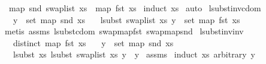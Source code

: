 \begin{isabellebody}
\ \ {\isachardoublequoteopen}map\ snd\ {\isacharparenleft}{\kern0pt}swap{\isacharunderscore}{\kern0pt}list\ xs{\isacharparenright}{\kern0pt}\ {\isacharequal}{\kern0pt}\ map\ fst\ xs{\isachardoublequoteclose}\isanewline
%
\isadelimproof
%
\endisadelimproof
%
\isatagproof
{}\isamarkupfalse%
\ {\isacharparenleft}{\kern0pt}induct\ xs{\isacharparenright}{\kern0pt}\isanewline
{}\isamarkupfalse%
\ auto%
\endisatagproof
{\isafoldproof}%
%
\isadelimproof
\isanewline
%
\endisadelimproof
\isanewline
\isanewline
{}\isamarkupfalse%
\ lsubst{\isacharunderscore}{\kern0pt}inv{\isacharunderscore}{\kern0pt}cdom{\isacharcolon}{\kern0pt}\isanewline
\ \ \ {\isachardoublequoteopen}y\ {\isasymin}\ set\ {\isacharparenleft}{\kern0pt}map\ snd\ xs{\isacharparenright}{\kern0pt}{\isachardoublequoteclose}\isanewline
\ \ \ {\isachardoublequoteopen}lsubst\ {\isacharparenleft}{\kern0pt}swap{\isacharunderscore}{\kern0pt}list\ xs{\isacharparenright}{\kern0pt}\ y\ {\isasymin}\ set\ {\isacharparenleft}{\kern0pt}map\ fst\ xs{\isacharparenright}{\kern0pt}{\isachardoublequoteclose}\isanewline
%
\isadelimproof
%
\endisadelimproof
%
\isatagproof
{}\isamarkupfalse%
\ {\isacharparenleft}{\kern0pt}metis\ assms\ lsubst{\isacharunderscore}{\kern0pt}cdom\ swap{\isacharunderscore}{\kern0pt}map{\isacharunderscore}{\kern0pt}fst\ swap{\isacharunderscore}{\kern0pt}map{\isacharunderscore}{\kern0pt}snd{\isacharparenright}{\kern0pt}%
\endisatagproof
{\isafoldproof}%
%
\isadelimproof
\isanewline
%
\endisadelimproof
\isanewline
\isanewline
{}\isamarkupfalse%
\ lsubst{\isacharunderscore}{\kern0pt}inv{\isacharunderscore}{\kern0pt}inv{\isacharcolon}{\kern0pt}\isanewline
\ \ \ {\isachardoublequoteopen}distinct\ {\isacharparenleft}{\kern0pt}map\ fst\ xs{\isacharparenright}{\kern0pt}{\isachardoublequoteclose}\isanewline
\ \ \ {\isachardoublequoteopen}y\ {\isasymin}\ set\ {\isacharparenleft}{\kern0pt}map\ snd\ xs{\isacharparenright}{\kern0pt}{\isachardoublequoteclose}\isanewline
\ \ \ {\isachardoublequoteopen}lsubst\ xs\ {\isacharparenleft}{\kern0pt}lsubst\ {\isacharparenleft}{\kern0pt}swap{\isacharunderscore}{\kern0pt}list\ xs{\isacharparenright}{\kern0pt}\ y{\isacharparenright}{\kern0pt}\ {\isacharequal}{\kern0pt}\ y{\isachardoublequoteclose}\isanewline
%
\isadelimproof
%
\endisadelimproof
%
\isatagproof
{}\isamarkupfalse%
\ assms\isanewline
{}\isamarkupfalse%
\ {\isacharparenleft}{\kern0pt}induct\ xs\ arbitrary{\isacharcolon}{\kern0pt}\ y{\isacharparenright}{\kern0pt}\isanewline

\end{isabellebody}
